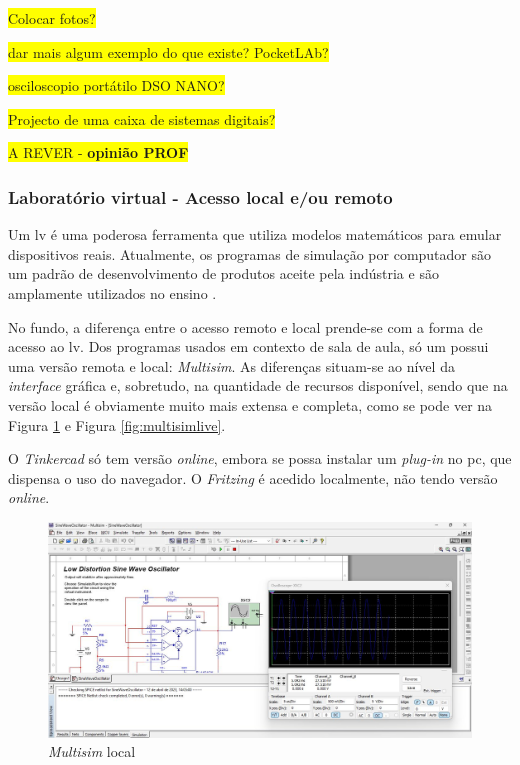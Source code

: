 \colorbox{yellow}{Colocar fotos?}

\colorbox{yellow}{dar mais algum exemplo do que existe? PocketLAb?}

\colorbox{yellow}{osciloscopio portátilo DSO NANO?}

\colorbox{yellow}{Projecto de uma caixa de sistemas digitais?}

\colorbox{yellow}{A REVER - \textbf{opinião PROF}}


\subsubsection{Laboratório virtual - Acesso local e/ou remoto}
Um \acrshort{lv} é uma poderosa ferramenta que utiliza modelos matemáticos para emular dispositivos reais. Atualmente, os programas de simulação por computador são um padrão de desenvolvimento de produtos aceite pela indústria e são amplamente utilizados no ensino \cite{HERADIO20161} \cite{POTKONJAK2016309}. 

No fundo, a diferença entre o acesso remoto e local prende-se com a forma de acesso ao \acrshort{lv}. 
Dos programas usados em contexto de sala de aula, só um possui uma versão remota e local: \textit{Multisim}\cite{multisim}. As diferenças situam-se ao nível da \textit{interface} gráfica e, sobretudo, na quantidade de recursos disponível, sendo que na versão local é obviamente muito mais extensa e completa, como se pode ver na Figura \ref{fig:multisimlocal} e Figura \ref{fig:multisimlive}.

O \textit{Tinkercad}\cite{tinkercad} só tem versão \textit{online}, embora se possa instalar um \textit{plug-in} no \acrshort{pc}, que dispensa o uso do navegador. O \textit{Fritzing} \cite{fritzingdown} é acedido localmente, não tendo versão \textit{online}.

\begin{figure}[hbtp]
\centering
    \includegraphics[width=0.9\linewidth]{figures/Multisim_Desktop.png}
    \caption{\textit{Multisim} local}
    \label{fig:multisimlocal}
\end{figure}

